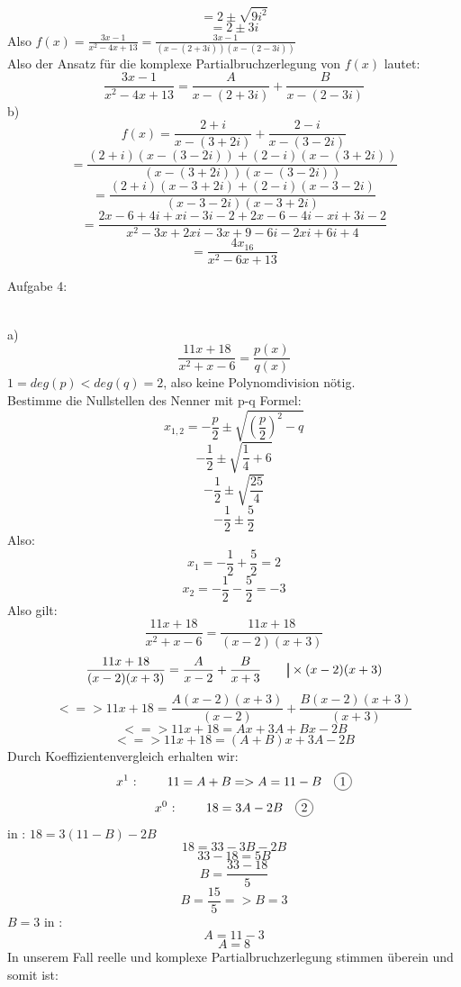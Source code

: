\documentclass[11pt]{article}
\newcommand\mybar{\kern1pt\rule[-\dp\strutbox]{.8pt}{\baselineskip}\kern1pt}
\newcommand*\circled[1]{\tikz[baseline=(char.base)]{
            \node[shape=circle,draw,inner sep=2pt] (char) {#1};}}
\begin{document}
				$$=2 \pm \sqrt{9i^2}$$
				$$=2\pm 3i$$
				Also $f(x)=\frac{3x-1}{x^2-4x+13}=\frac{3x-1}{(x-(2+3i))(x-(2-3i))}$\\
				Also der Ansatz für die komplexe Partialbruchzerlegung von $f(x)$ lautet:
				$$\frac{3x-1}{x^2-4x+13}=\frac{A}{x-(2+3i)}+\frac{B}{x-(2-3i)}$$
			\indent b)\\
				$$f(x)=\frac{2+i}{x-(3+2i)}+\frac{2-i}{x-(3-2i)}$$
				$$=\frac{(2+i)(x-(3-2i))+(2-i)(x-(3+2i))}{(x-(3+2i))(x-(3-2i))}$$
				$$=\frac{(2+i)(x-3+2i)+(2-i)(x-3-2i)}{(x-3-2i)(x-3+2i)}$$
				$$=\frac{2x-6+4i+xi-3i-2+2x-6-4i-xi+3i-2}{x^2-3x+2xi-3x+9-6i-2xi+6i+4}$$
				$$=\frac{4x_16}{x^2-6x+13}$$
		\noindent \begin{Large}Aufgabe 4:\end{Large}\\[2pt]
			\indent a)\\
				$$\frac{11x+18}{x^2+x-6}=\frac{p(x)}{q(x)}$$
				$1=deg(p)<deg(q)=2$, also keine Polynomdivision nötig.\\
				Bestimme die Nullstellen des Nenner mit p-q Formel:\\
				$$x_{1,2}=-\frac{p}{2}\pm \sqrt{\left(\frac{p}{2}\right)^2-q}$$
				$$-\frac{1}{2}\pm\sqrt{\frac{1}{4}+6}$$
				$$-\frac{1}{2}\pm\sqrt{\frac{25}{4}}$$
				$$-\frac{1}{2}\pm\frac{5}{2}$$
				Also:\\
				$$x_1=-\frac{1}{2}+\frac{5}{2}=2$$
				$$x_2=-\frac{1}{2}-\frac{5}{2}=-3$$
				Also gilt:\\
				$$\frac{11x+18}{x^2+x-6}=\frac{11x+18}{(x-2)(x+3)}$$
				$$\frac{11x+18}{(x-2)(x+3)}=\frac{A}{x-2}+\frac{B}{x+3} \hspace{20pt} \mybar \times (x-2)(x+3)$$
				$$<=>11x+18=\frac{A(x-2)(x+3)}{(x-2)}+\frac{B(x-2)(x+3)}{(x+3)}$$
				$$<=>11x+18=Ax+3A+Bx-2B$$
				$$<=>11x+18=(A+B)x+3A-2B$$
				Durch Koeffizientenvergleich erhalten wir:\\
				$$x^1 \mbox{ : } \hspace{20pt} 11=A+B=>A=11-B \hspace{10pt} \mbox{\circled{1}}$$
				$$x^0 \mbox{ : } \hspace{20pt} 18=3A-2B \hspace{10pt} \mbox{\circled{2}}$$
				\indent \circled{1} in \circled{2}: \hspace{50pt} $18=3(11-B)-2B$
				$$18=33-3B-2B$$
				$$33-18=5B$$
				$$B=\frac{33-18}{5}$$
				$$B=\frac{15}{5}=>B=3$$
				\indent $B=3$ in \circled{1}:\\
				$$A=11-3$$
				$$A=8$$
				In unserem Fall reelle und komplexe Partialbruchzerlegung stimmen überein und somit ist:\\
\end{document}
